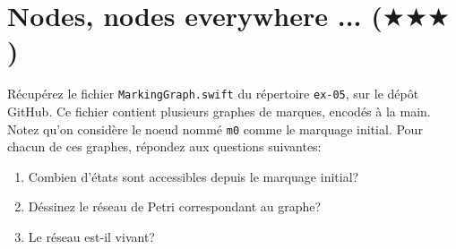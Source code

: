 \documentclass[a4paper, titlepage]{article}
\numberwithin{figure}{section}
\numberwithin{table}{section}
\begin{document}
\section{Nodes, nodes everywhere ... ($\bigstar\bigstar\bigstar$)}

Récupérez le fichier \texttt{MarkingGraph.swift} du répertoire \texttt{ex-05}, sur le dépôt GitHub.
Ce fichier contient plusieurs graphes de marques,
encodés à la main.
Notez qu'on considère le noeud nommé \texttt{m0} comme le marquage initial.
Pour chacun de ces graphes, répondez aux questions suivantes:

\begin{enumerate}
  \item Combien d'états sont accessibles depuis le marquage initial?
  \item Déssinez le réseau de Petri correspondant au graphe?
  \item Le réseau est-il vivant?
\end{enumerate}
\end{document}
